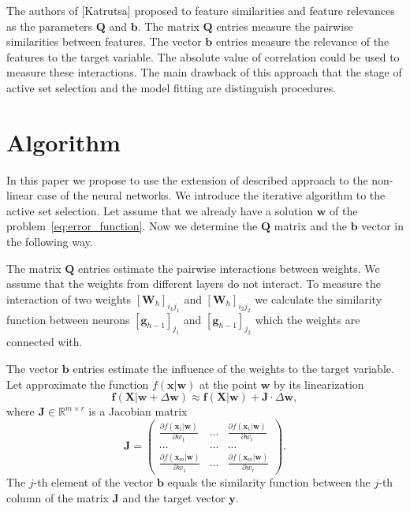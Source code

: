 \documentclass[a4paper,12pt]{article}
\theoremstyle{plain} %
\theoremstyle{definition} %
\theoremstyle{remark} %
\newcommand{\bb}{\mathbf{b}}
\newcommand{\bw}{\mathbf{w}}
\newcommand{\bQ}{\mathbf{Q}}
\newcommand{\by}{\mathbf{y}}
\newcommand{\bx}{\mathbf{x}}
\newcommand{\bX}{\mathbf{X}}
\newcommand{\bbR}{\mathbb{R}}
\begin{document}
	The authors of [Katrutsa] proposed to feature similarities and feature relevances as the parameters $\bQ$ and $\bb$.
	The matrix $\bQ$ entries measure the pairwise similarities between features. The vector $\bb$ entries measure the relevance of the features to the target variable. 
	The absolute value of correlation could be used to measure these interactions.
	The main drawback of this approach that the stage of active set selection and the model fitting are distinguish procedures. 
	
	\section*{Algorithm}
	In this paper we propose to use the extension of described approach to the non-linear case of the neural networks. We introduce the iterative algorithm to the active set selection.
	Let assume that we already have a solution $\bw$ of the problem~\ref{eq:error_function}. Now we determine the $\bQ$ matrix and the $\bb$ vector in the following way.
	
	The matrix $\bQ$ entries estimate the pairwise interactions between weights. We assume that the weights from different layers do not interact. To measure the interaction of two weights $[\mathbf{W}_h]_{i_1j_1}$ and $[\mathbf{W}_h]_{i_2j_2}$ we calculate the similarity function between neurons $[\mathbf{g}_{h-1}]_{j_1}$ and $[\mathbf{g}_{h-1}]_{j_2}$ which the weights are connected with.
	
	The vector $\bb$ entries estimate the influence of the weights to the target variable. Let approximate the function $f(\bx | \bw)$ at the point $\bw$ by its linearization
	\begin{equation}
		\mathbf{f} (\bX | \bw + \Delta \bw) \approx \mathbf{f}(\bX | \bw) + \mathbf{J} \cdot \Delta \bw,
	\end{equation}
	where $\mathbf{J} \in \bbR^{m \times r}$ is a Jacobian matrix
	\begin{equation}
		\mathbf{J} = 
		\begin{pmatrix}
			\frac{\partial f(\bx_1 | \bw)}{\partial w_1} & \dots & 
			\frac{\partial f(\bx_1 | \bw)}{\partial w_r} \\
			\dots & \dots & \dots \\
			\frac{\partial f(\bx_m | \bw)}{\partial w_1} & \dots & 
			\frac{\partial f(\bx_m | \bw)}{\partial w_r}
		\end{pmatrix}.
	\end{equation}
	The $j$-th element of the vector $\bb$ equals the similarity function between the $j$-th column of the matrix $\mathbf{J}$ and the target vector $\by$.
	
\end{document}
